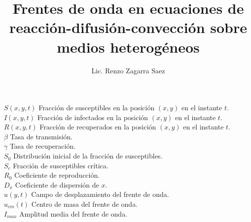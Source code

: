 \documentclass[screen,preprint,pagebackref]{ibtesis}
\title{Frentes de onda en ecuaciones de reacción-difusión-convección sobre medios heterogéneos}
\author{Lic. Renzo Zagarra Saez}
\begin{document}

\begin{preliminary}



\tableofcontents 

\begin{abreviaturas}
  \noindent
  {$S(x,y,t)$ \hspace*{.3cm} Fracción de susceptibles en la posición $(x,y)$ en el instante $t$.\\
  $I(x,y,t)$ \hspace*{.3cm} Fracción de infectados en la posición $(x,y)$ en el instante $t$.\\
  $R(x,y,t)$ \hspace*{.3cm} Fracción de recuperados en la posición $(x,y)$ en el instante $t$.\\
  $\beta$ \hspace*{.3cm} Tasa de transmisión.\\
  $\gamma$ \hspace*{.3cm} Tasa de recuperación.\\
  $S_0$ \hspace*{.3cm} Distribución inicial de la fracción de susceptibles.\\
  $S_c$ \hspace*{.3cm} Fracción de susceptibles crítica.\\
  $R_0$ \hspace*{.3cm} Coeficiente de reproducción.\\
  $D_{x}$ \hspace*{.3cm} Coeficiente de dispersión de $x$.\\
  $u(y,t)$ \hspace*{.3cm} Campo de desplazamiento del frente de onda.\\
  $u_{cm}(t)$ \hspace*{.3cm} Centro de masa del frente de onda.\\
  $I_{max}$ \hspace*{.3cm} Amplitud media del frente de onda.\\
}
\end{abreviaturas}
\end{preliminary}
\end{document}
